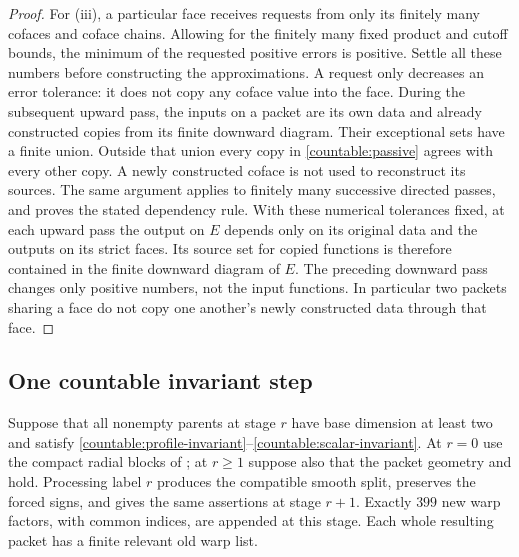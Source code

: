 \begin{proof}
For (iii), a particular face receives requests from only its finitely
many cofaces and coface chains. Allowing for the finitely many fixed
product and cutoff bounds, the minimum of the requested positive
errors is positive. Settle all these numbers before constructing the
approximations. A request only decreases an error tolerance: it does
not copy any coface value into the face. During the subsequent upward
pass, the inputs on a packet are its own data and already constructed
copies from its finite downward diagram. Their exceptional sets have
a finite union. Outside that union every copy in
\eqref{countable:passive} agrees with every other copy. A newly
constructed coface is not used to reconstruct its sources. The same
argument applies to finitely many successive directed passes, and
proves the stated dependency rule.
With these numerical tolerances fixed, at each upward pass the output
on $E$ depends only on its original data and the outputs on its strict
faces. Its source set for copied functions is therefore contained in
the finite downward diagram of $E$. The preceding downward pass changes only positive
numbers, not the input functions. In particular two packets sharing
a face do not copy one another's newly constructed data through that face.
\end{proof}

\subsection{One countable invariant step}

\begin{proposition}\label{countable:step}
Suppose that all nonempty parents at stage $r$ have base dimension at
least two and satisfy \eqref{countable:profile-invariant}--\eqref{countable:scalar-invariant}.
At $r=0$ use the compact radial blocks of ; at
$r\ge1$ suppose also that the packet geometry and
 hold. Processing label $r$ produces the
compatible smooth split, preserves the forced signs, and gives the
same assertions at stage $r+1$. Exactly $399$ new warp factors, with
common indices, are appended at this stage. Each whole resulting
packet has a finite relevant old warp list.
\end{proposition}

